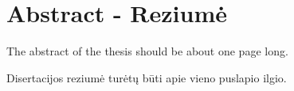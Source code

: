 \chapter*{Abstract - Reziumė }
\label{cha:abstract}

The abstract of the thesis should be about one page long.

Disertacijos reziumė turėtų būti apie vieno puslapio ilgio.